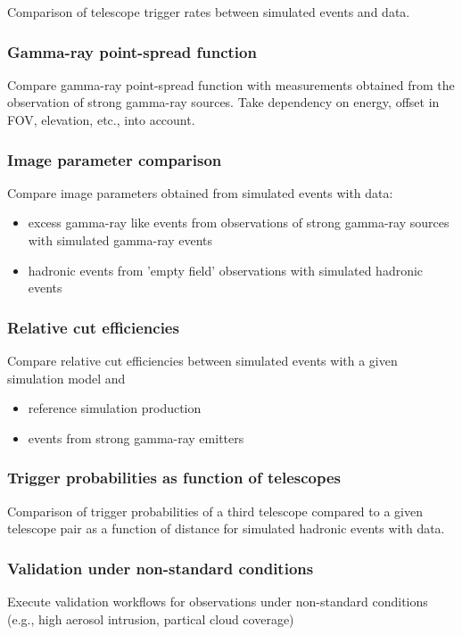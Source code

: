 Comparison of telescope trigger rates between simulated events and data.

\subsubsection{Gamma-ray point-spread function}

Compare gamma-ray point-spread function with measurements obtained from the observation of strong gamma-ray sources.
Take dependency on energy, offset in FOV, elevation, etc., into account.

\subsubsection{Image parameter comparison}

Compare image parameters obtained from simulated events with data:
\begin{itemize}
    \item excess gamma-ray like events from observations of strong gamma-ray sources with simulated gamma-ray events
    \item hadronic events from 'empty field' observations with simulated hadronic events
\end{itemize}

\subsubsection{Relative cut efficiencies}

Compare relative cut efficiencies between simulated events with a given simulation model and 
\begin{itemize}
    \item reference simulation production
    \item events from strong gamma-ray emitters
\end{itemize}

\subsubsection{Trigger probabilities as function of telescopes}

Comparison of trigger probabilities of a third telescope compared to a given telescope pair as a function of distance for simulated hadronic events with data.

\subsubsection{Validation under non-standard conditions}

Execute validation workflows for observations under non-standard conditions (e.g., high aerosol intrusion, partical cloud coverage)